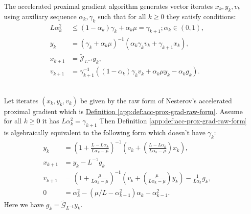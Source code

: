 \documentclass[12pt]{article}
\begin{document}
    \begin{definition}
    \label{app:def:acc-prox-grad-raw-form}
        The accelerated proximal gradient algorithm generates vector iterates $x_k, y_k, v_k$ using auxiliary sequence $\alpha_k, \gamma_k$ such that for all $k\ge0$ they satisfy conditions: 
        \begin{align*}
            L\alpha_k^2 
            &\le 
            (1 - \alpha_k)\gamma_k + \alpha_k\mu = \gamma_{k + 1}; \alpha_k \in (0, 1), 
            \\
            y_k &= (\gamma_k + \alpha_k \mu)^{-1}
            (\alpha_k \gamma_k v_k + \gamma_{k + 1}x_k),
            \\
            x_{k + 1}&= 
            \widetilde{\mathcal J}_{L^{-1}} y_k, 
            \\
            v_{k + 1} &= 
            \gamma_{k + 1}^{-1}
            \left(
                (1 - \alpha_k)\gamma_k v_k + \alpha_k \mu y_k - \alpha_k g_k
            \right). 
        \end{align*}
    \end{definition}
    \begin{theorem}\label{app:theorem:acc-prox-grad-intermediate}\; \\
        Let iterates $(x_k, y_k, v_k)$ be given by the raw form of Nesterov's accelerated proximal gradient which is 
        \hyperref[app:def:acc-prox-grad-raw-form]{Definition \ref*{app:def:acc-prox-grad-raw-form}}. 
        Assume for all $k \ge 0$ it has $L\alpha_k^2 = \gamma_{k + 1}$ 
        Then Definition \ref*{app:def:acc-prox-grad-raw-form} is algebraically equivalent to the following form which doesn't have $\gamma_k$: 
        \begin{align*}
            y_k &= 
            \left(
                1 + \frac{L - L\alpha_k}{L\alpha_k - \mu}
            \right)^{-1}
            \left(
                v_k + 
                \left(\frac{L - L\alpha_k}{L\alpha_k - \mu} \right) x_k
            \right),
            \\
            x_{k + 1} &= 
            y_k - L^{-1}  g_k
            \\
            v_{k + 1} &= 
            \left(
                1 + \frac{\mu}{L \alpha_k - \mu}
            \right)^{-1}
            \left(
                v_k + 
                \left(\frac{\mu}{L \alpha_k - \mu}\right) y_k
            \right) - \frac{1}{L\alpha_{k}} g_k,
            \\
            0 &= \alpha_k^2 - \left(\mu/L - \alpha_{k -1}^2\right) \alpha_k - \alpha_{k - 1}^2. 
        \end{align*}
        Here we have $g_k = \widetilde{\mathcal G}_{L^{-1}}y_k$. 
    \end{theorem}
\end{document}
